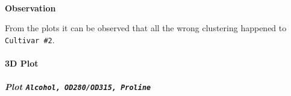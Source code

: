 \documentclass[11pt]{article}
\begin{document}
    \begin{center}
    \end{center}
    { \hspace*{\fill} \\}
    
    \begin{center}
    \end{center}
    { \hspace*{\fill} \\}
    
    \begin{center}
    \end{center}
    { \hspace*{\fill} \\}
    
    \textbf{Observation}

From the plots it can be observed that all the wrong clustering happened
to \texttt{Cultivar\ \#2}.

    \hypertarget{d-plot}{%
\paragraph{3D Plot}\label{d-plot}}

\hypertarget{plot-alcohol-od280od315-proline}{%
\subparagraph{\texorpdfstring{Plot
\texttt{\textquotesingle{}Alcohol\textquotesingle{},\ \textquotesingle{}OD280/OD315\textquotesingle{},\ \textquotesingle{}Proline\textquotesingle{}}}{Plot 'Alcohol', 'OD280/OD315', 'Proline'}}\label{plot-alcohol-od280od315-proline}}
\end{document}
